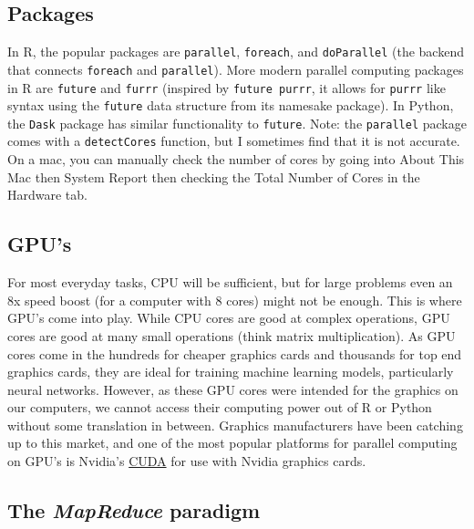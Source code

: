 \documentclass[]{book}
\begin{document}
\hypertarget{packages}{%
\subsection{Packages}\label{packages}}

In R, the popular packages are \texttt{parallel}, \texttt{foreach}, and \texttt{doParallel} (the backend that connects \texttt{foreach} and \texttt{parallel}). More modern parallel computing packages in R are \texttt{future} and \texttt{furrr} (inspired by \texttt{future\ purrr}, it allows for \texttt{purrr} like syntax using the \texttt{future} data structure from its namesake package). In Python, the \texttt{Dask} package has similar functionality to \texttt{future}. Note: the \texttt{parallel} package comes with a \texttt{detectCores} function, but I sometimes find that it is not accurate. On a mac, you can manually check the number of cores by going into About This Mac then System Report then checking the Total Number of Cores in the Hardware tab.

\hypertarget{gpus}{%
\subsection{GPU's}\label{gpus}}

For most everyday tasks, CPU will be sufficient, but for large problems even an 8x speed boost (for a computer with 8 cores) might not be enough. This is where GPU's come into play. While CPU cores are good at complex operations, GPU cores are good at many small operations (think matrix multiplication). As GPU cores come in the hundreds for cheaper graphics cards and thousands for top end graphics cards, they are ideal for training machine learning models, particularly neural networks. However, as these GPU cores were intended for the graphics on our computers, we cannot access their computing power out of R or Python without some translation in between. Graphics manufacturers have been catching up to this market, and one of the most popular platforms for parallel computing on GPU's is Nvidia's \href{https://developer.nvidia.com/cuda-zone}{CUDA} for use with Nvidia graphics cards.

\hypertarget{the-mapreduce-paradigm}{%
\subsection{\texorpdfstring{The \emph{MapReduce} paradigm}{The MapReduce paradigm}}\label{the-mapreduce-paradigm}}
\end{document}
